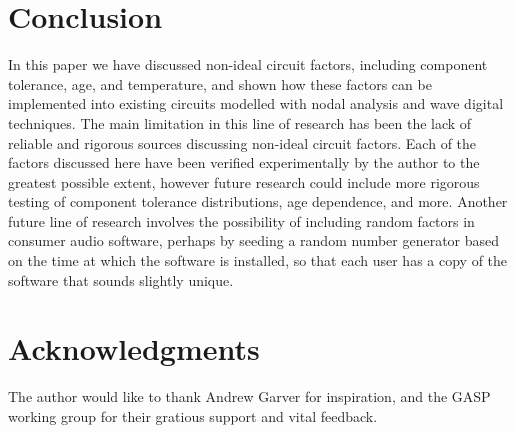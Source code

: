 \documentclass[twoside,a4paper]{article}
\begin{document}
\section{Conclusion} \label{sec:conclusion}
%
In this paper we have discussed non-ideal circuit factors, including
component tolerance, age, and temperature, and shown how these factors
can be implemented into existing circuits modelled with nodal analysis
and wave digital techniques.
\newline\newline
The main limitation in this line of research has been the lack of
reliable and rigorous sources discussing non-ideal circuit factors.
Each of the factors discussed here have been verified experimentally
by the author to the greatest possible extent, however future research
could include more rigorous testing of component tolerance distributions,
age dependence, and more. Another future line of research involves the
possibility of including random factors in consumer audio software, perhaps
by seeding a random number generator based on the time at which the
software is installed, so that each user has a copy of the software that
sounds slightly unique.

\section{Acknowledgments}
%
The author would like to thank Andrew Garver for inspiration, and the
GASP working group for their gratious support and vital feedback.



\end{document}

